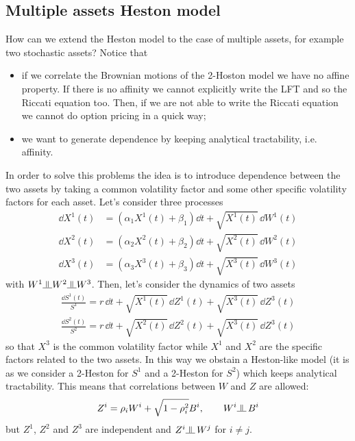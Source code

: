 \subsection{Multiple assets Heston model}
How can we extend the Heston model to the case of multiple assets, for example two stochastic assets? Notice that
\begin{itemize}
    \item if we correlate the Brownian motions of the 2-Hoston model we have no affine property. If there is no affinity we cannot explicitly write the LFT and so the Riccati equation too. Then, if we are not able to write the Riccati equation we cannot do option pricing in a quick way;
    \item we want to generate dependence by keeping analytical tractability, i.e. affinity.
\end{itemize}
In order to solve this problems the idea is to introduce dependence between the two assets by taking a common volatility factor and some other specific volatility factors for each asset. Let's consider three processes
\begin{align*}
    \dd X^1(t) &= (\alpha_1X^1(t) + \beta_1)\dd t + \sqrt{X^1(t)}\,\dd W^1(t) \\
    \dd X^2(t) &= (\alpha_2X^2(t) + \beta_2)\dd t + \sqrt{X^2(t)}\,\dd W^2(t) \\
    \dd X^3(t) &= (\alpha_3X^3(t) + \beta_3)\dd t + \sqrt{X^3(t)}\,\dd W^3(t)
\end{align*}
with $W^1 \indep W^2 \indep W^3$. Then, let's consider the dynamics of two assets
\begin{align*}
    \frac{\dd S^1(t)}{S^1} = r\,\dd t + \sqrt{X^1(t)}\,\dd Z^1(t) + \sqrt{X^3(t)}\,\dd Z^3(t) \\
    \frac{\dd S^2(t)}{S^2} = r\,\dd t + \sqrt{X^2(t)}\,\dd Z^2(t) + \sqrt{X^3(t)}\,\dd Z^3(t)
\end{align*}
so that $X^3$ is the common volatility factor while $X^1$ and $X^2$ are the specific factors related to the two assets. In this way we obstain a Heston-like model (it is as we consider a 2-Heston for $S^1$ and a 2-Heston for $S^2$) which keeps analytical tractability. This means that correlations between $W$ and $Z$ are allowed:
\begin{equation*}
    Z^i = \rho_i W^i + \sqrt{1-\rho_i^2} B^i, \qquad W^i \indep\, B^i
\end{equation*}
but $Z^1$, $Z^2$ and $Z^3$ are independent and $Z^i \indep\, W^j$ for $i\ne j$. \\
